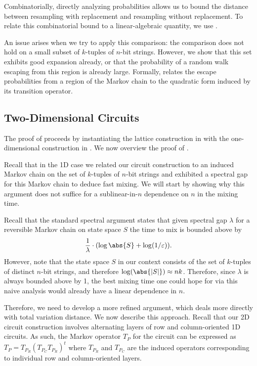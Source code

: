 Combinatorially, directly analyzing probabilities allows us to bound the distance between resampling with replacement and resampling without replacement. To relate this combinatorial bound to a linear-algebraic quantity, we use .

An issue arises when we try to apply this comparison: the comparison does not hold on a small subset of $k$-tuples of $n$-bit strings. However, we show that this set exhibits good expansion already, or that the probability of a random walk escaping from this region is already large. Formally,  relates the escape probabilities from a region of the Markov chain to the quadratic form induced by its transition operator.



\subsection{Two-Dimensional Circuits}

The proof of  proceeds by instantiating the lattice construction in  with the one-dimensional construction in . We now overview the proof of .

Recall that in the 1D case we related our circuit construction to an induced Markov chain on the set of $k$-tuples of $n$-bit strings and exhibited a spectral gap for this Markov chain to deduce fast mixing. We will start by showing why this argument does not suffice for a sublinear-in-$n$ dependence on $n$ in the mixing time.

Recall that the standard spectral argument states that given spectral gap $\lambda$ for a reversible Markov chain on state space $S$ the time to mix is bounded above by
\begin{align*}
    \frac{1}{\lambda}\cdot(\log{\abs{S}} + \log(1/\varepsilon)).
\end{align*}
However, note that the state space $S$ in our context consists of the set of $k$-tuples of distinct $n$-bit strings, and therefore $\log(\abs{|S|}) \approx nk$. Therefore, since $\lambda$ is always bounded above by 1, the best mixing time one could hope for via this naive analysis would already have a linear dependence in $n$.

Therefore, we need to develop a more refined argument, which deals more directly with total variation distance. We now describe this approach. Recall that our 2D circuit construction involves alternating layers of row and column-oriented 1D circuits. As such, the Markov operator $T_P$ for the circuit can be expressed as $T_P = T_{P_R}(T_{P_C}T_{P_R})^t$ where $T_{P_R}$ and $T_{P_C}$ are the induced operators corresponding to individual row and column-oriented layers. 

